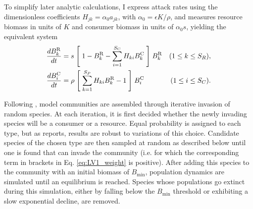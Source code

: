 \documentclass[a4paper]{report}
\begin{document}
To simplify later analytic calculations, I express attack rates using
the dimensionless coefficients $H_{jk}=\alpha_0 a_{jk}$, with
$\alpha_0=\epsilon K/\rho$, and measures resource biomass in units of
$K$ and consumer biomass in units of $\alpha_0 s$, yielding the
equivalent system
\begin{subequations}
  \label{eq:LV1_weight}
  \begin{align}
    \frac{dB_{k}^{\mathrm{R}}}{dt}
    &=s\Biggm[
      1-B_{k}^{\mathrm{R}}-\sum_{i=1}^{S_{\mathrm{C}}}H_{ki}B_{k}^{\mathrm{C}}
      \Biggm]B_{k}^{\mathrm{R}}&(1\le k \le S_R)\label{eq:LV_consumer1_weight},\\
    \frac{dB_{i}^{\mathrm{C}}}{dt}
    &=\rho\Biggm[
      \sum_{k=1}^{S_{P}}H_{ki}B_{k}^{\mathrm{R}}-1
      \Biggm]B_{i}^{\mathrm{C}}&(1\le i \le S_C).\label{eq:LV_resource1_weight}
  \end{align}
\end{subequations}

Following \citep{Rossberg2013}, model communities are assembled through
iterative invasion of random species. At each iteration, it is first
decided whether the newly invading species will be a
consumer or a resource. Equal probability is assigned to each type,
but as \citep{Rossberg2013} reports, results are robust to variations
of this choice. Candidate species of the chosen type are then sampled
at random as described below until one is found that can invade the
community (i.e. for which the corresponding term in brackets in
Eq. \eqref{eq:LV1_weight} is positive). After adding this species to
the community with an initial biomass of $B_{\text{min}}$, population
dynamics are simulated until an equilibrium is reached. Species whose
populations go extinct during this simulation, either by falling below
the $B_{\text{min}}$ threshold or exhibiting a slow exponential
decline, are removed.
\end{document}
